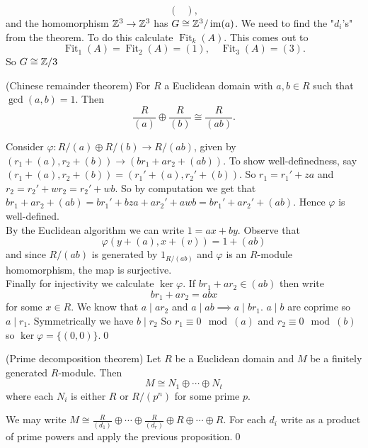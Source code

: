 \documentclass{article}
\DeclareMathOperator{\Fit}{Fit}
\begin{document}
\begin{itemize}
\[\begin{pmatrix}
  \end{pmatrix},
\]
and the homomorphism $ \mathbb{Z}^3\to \mathbb{Z}^3 $ has $ G\cong \mathbb{Z}^3/\operatorname{im}(a) $. 
We need to find the "$ d_i $'s" from the theorem. To do this calculate $ \Fit_k(A) $. This comes out to
\[
  \Fit_1(A)=\Fit_2(A)=(1),\quad \Fit_3(A)=(3).
\]
So $ G\cong \mathbb{Z}/3 $
\begin{proposition}
	(Chinese remainder theorem) For $ R $ a Euclidean domain with $ a,b\in R $ such that $ \gcd(a,b)=1 $. Then
  \[
	  \frac R{(a)}\oplus \frac R{(b)}\cong \frac R{(ab)}.
  \]
\end{proposition}
\pf Consider $ \varphi: R/(a)\oplus R/(b)\to R/(ab) $, given by $ (r_1+(a),r_2+(b))\to (br_1+ar_2+(ab)) $. To show well-definedness, say $ (r_1+(a),r_2+(b))=(r_1'+(a),r_2'+(b)) $. So $ r_1=r_1'+za $ and $ r_2=r_2'+wr_2=r_2'+wb $. So by computation we get that $ br_1+ar_2+(ab)=br_1'+bza+ar_2'+awb=br_1'+ar_2'+(ab) $. Hence $ \varphi $ is well-defined.\\
By the Euclidean algorithm we can write $ 1=ax+by $. Observe that
\[
  \varphi(y+(a),x+(v))=1+(ab)
\]
and since $ R/(ab) $ is generated by $ 1_{R/(ab)} $ and $ \varphi $ is an $ R $-module homomorphism, the map is surjective.\\
Finally for injectivity we calculate $ \ker\varphi $. If $ br_1+ar_2\in (ab) $ then write
\[
  br_1+ar_2=abx
\]
for some $ x\in R $. We know that $ a \mid ar_2 $ and $ a \mid ab\implies a\mid br_1 $. $ a\mid b $ are coprime so $ a\mid r_1 $. Symmetrically we have $ b\mid r_2 $ So $ r_1\equiv 0 \mod (a) $ and $ r_2\equiv 0\mod (b) $ so $ \ker\varphi = \{(0,0)\} $.\qed
\begin{theorem}
	(Prime decomposition theorem) Let $ R $ be a Euclidean domain and $ M $ be a finitely generated $ R $-module. Then
\[
  M\cong N_1\oplus \cdots \oplus N_t
\]
where each $ N_i $ is either $ R $ or $ R/(p^n) $ for some prime $ p $.
\end{theorem} 
\pf We may write $ M\cong \frac R{(d_1)}\oplus \cdots \oplus \frac R{(d_r)}\oplus R\oplus \cdots \oplus R $. For each $ d_i $ write as a product of prime powers and apply the previous proposition.\qed

\end{itemize}
\end{document}
